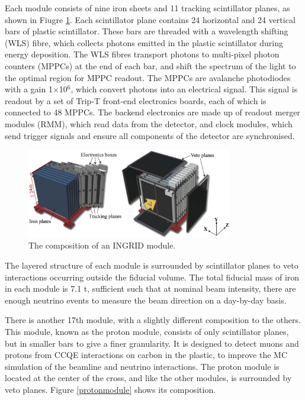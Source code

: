Each module consists of nine iron sheets and 11 tracking scintillator planes, as shown in Fiugre \ref{ingridmodule}. Each scintillator plane contains 24 horizontal and 24 vertical bars of plastic scintillator. These bars are threaded with a wavelength shifting (WLS) fibre, which collects photons emitted in the plastic scintillator during energy deposition. The WLS fibres transport photons to multi-pixel photon counters (MPPCs) at the end of each bar, and shift the spectrum of the light to the optimal region for MPPC readout. The MPPCs are avalanche photodiodes with a gain 1$\times$10$^6$, which convert photons into an electrical signal. This signal is readout by a set of Trip-T front-end electronics boards\cite{tript}, each of which is connected to 48 MPPCs. The backend electronics are made up of readout merger modules (RMM), which read data from the detector, and clock modules, which send trigger signals and ensure all components of the detector are synchronised.

\begin{figure}
\centering
\includegraphics*[width=0.8\textwidth,clip]{figs/ingridmodule}
\caption{The composition of an INGRID module.} \label{ingridmodule}
\end{figure}

The layered structure of each module is surrounded by scintillator planes to veto interactions occurring outside the fiducial volume. The total fiducial mass of iron in each module is 7.1 t, sufficient such that at nominal beam intensity, there are enough neutrino events to measure the beam direction on a day-by-day basis. 

There is another 17th module, with a slightly different composition to the others. This module, known as the proton module, consists of only scintillator planes, but in smaller bars to give a finer granularity. It is designed to detect muons and protons from CCQE interactions on carbon in the plastic, to improve the MC simulation of the beamline and neutrino interactions. The proton module is located at the center of the cross, and like the other modules, is surrounded by veto planes. Figure \ref{protonmodule} shows its composition.

